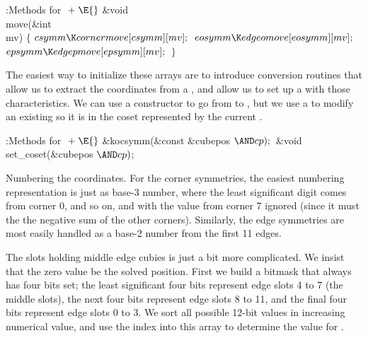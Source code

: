 \Y\B\4:Methods for \X${}\mathrel+\E{}$\6
\&{void} \\{move}(\&{int} \\{mv})\1\1\2\2\6
${}\{{}$\1\6
${}\\{csymm}\K\\{cornermove}[\\{csymm}][\\{mv}];{}$\6
${}\\{eosymm}\K\\{edgeomove}[\\{eosymm}][\\{mv}];{}$\6
${}\\{epsymm}\K\\{edgepmove}[\\{epsymm}][\\{mv}];{}$\6
\4${}\}{}$\2\par
\fi

The easiest way to initialize these arrays are to introduce
conversion routines that allow us to extract the coordinates from a
, and allow us to set up a  with those
characteristics.  We can use a constructor to go from  to
, but we use a  to modify an existing 
so it is in the coset represented by the current .

\Y\B\4:Methods for \X${}\mathrel+\E{}$\6
\&{kocsymm}(\&{const} \&{cubepos} ${}{\AND}\\{cp});{}$\7
\&{void} \\{set\_coset}(\&{cubepos} ${}{\AND}\\{cp}){}$;\par
\fi

Numbering the coordinates.
For the corner symmetries, the easiest numbering representation is
just as base-3 number, where the least significant digit comes from
corner 0, and so on, and with the value from corner 7 ignored (since
it must the the negative sum of the other corners).  Similarly, the
edge symmetries are most easily handled as a base-2 number from the
first 11 edges.

The slots holding middle edge cubies is just a bit more complicated.
We insist that the zero value be the solved position.  First we
build a bitmask that always has four bits set; the least significant
four bits represent edge slots 4 to 7 (the middle slots), the
next four bits represent edge slots 8 to 11, and the final four
bits represent edge slots 0 to 3.  We sort all possible 12-bit
values in increasing numerical value, and use the index into this
array to determine the value for .

